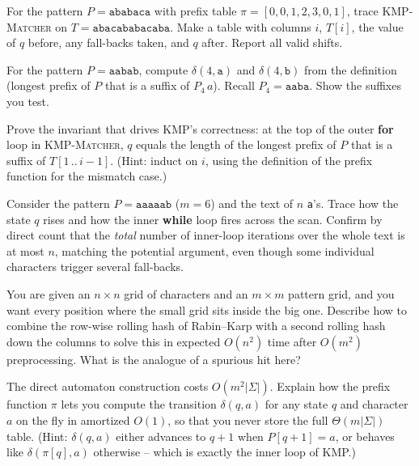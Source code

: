 \begin{exercise}
For the pattern $P=\texttt{ababaca}$ with prefix table
$\pi=[0,0,1,2,3,0,1]$, trace \textsc{KMP-Matcher} on
$T=\texttt{abacababacaba}$. Make a table with columns $i$, $T[i]$, the value of
$q$ before, any fall-backs taken, and $q$ after. Report all valid shifts.
\end{exercise}

\begin{exercise}
For the pattern $P=\texttt{aabab}$, compute $\delta(4,\texttt{a})$ and
$\delta(4,\texttt{b})$ from the definition (longest prefix of $P$ that is a
suffix of $P_4\,a$). Recall $P_4=\texttt{aaba}$. Show the suffixes you test.
\end{exercise}

\begin{exercise}
Prove the invariant that drives KMP's correctness: at the top of the outer
\textbf{for} loop in \textsc{KMP-Matcher}, $q$ equals the length of the longest
prefix of $P$ that is a suffix of $T[1\,..\,i-1]$. (Hint: induct on $i$, using
the definition of the prefix function for the mismatch case.)
\end{exercise}

\begin{exercise}
Consider the pattern $P=\texttt{aaaaab}$ ($m=6$) and the text of $n$ \texttt{a}'s.
Trace how the state $q$ rises and how the inner \textbf{while} loop fires across
the scan. Confirm by direct count that the \emph{total} number of inner-loop
iterations over the whole text is at most $n$, matching the potential argument,
even though some individual characters trigger several fall-backs.
\end{exercise}

\begin{exercise}
You are given an $n\times n$ grid of characters and an $m\times m$ pattern grid,
and you want every position where the small grid sits inside the big one.
Describe how to combine the row-wise rolling hash of Rabin--Karp with a second
rolling hash down the columns to solve this in expected $O(n^2)$ time after
$O(m^2)$ preprocessing. What is the analogue of a spurious hit here?
\end{exercise}

\begin{exercise}
The direct automaton construction costs $O(m^2|\Sigma|)$. Explain how the prefix
function $\pi$ lets you compute the transition $\delta(q,a)$ for any state $q$ and
character $a$ on the fly in amortized $O(1)$, so that you never store the full
$\Theta(m|\Sigma|)$ table. (Hint: $\delta(q,a)$ either advances to $q+1$ when
$P[q+1]=a$, or behaves like $\delta(\pi[q],a)$ otherwise -- which is exactly the
inner loop of KMP.)
\end{exercise}
